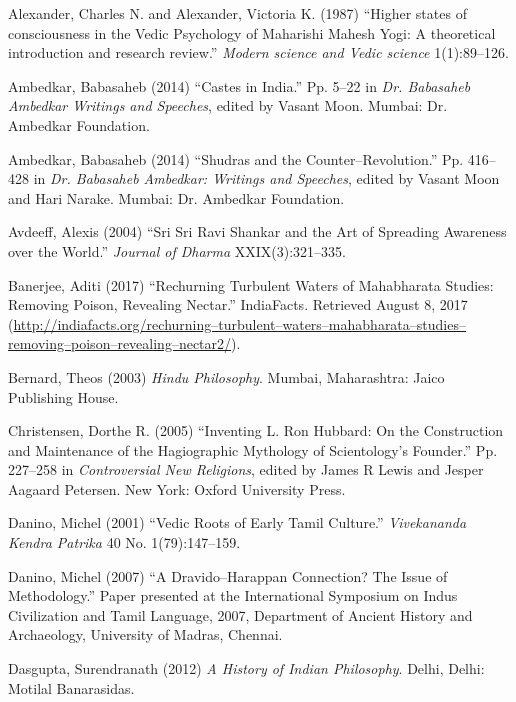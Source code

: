 \begin{thebibliography}{99}
 Alexander, Charles N. and Alexander, Victoria K. (1987) “Higher states of consciousness in the Vedic Psychology of Maharishi Mahesh Yogi: A theoretical introduction and research review.” \textit{Modern science and Vedic science} 1(1):89–126.

  Ambedkar, Babasaheb (2014) “Castes in India.” Pp. 5–22 in \textit{Dr. Babasaheb Ambedkar Writings and Speeches}, edited by Vasant Moon. Mumbai: Dr. Ambedkar Foundation.

  Ambedkar, Babasaheb (2014) “Shudras and the Counter–Revolution.” Pp. 416–428 in \textit{Dr. Babasaheb Ambedkar: Writings and Speeches}, edited by Vasant Moon and Hari Narake. Mumbai: Dr. Ambedkar Foundation.

  Avdeeff, Alexis (2004) “Sri Sri Ravi Shankar and the Art of Spreading Awareness over the World.” \textit{Journal of Dharma} XXIX(3):321–335.

  Banerjee, Aditi (2017) “Rechurning Turbulent Waters of Mahabharata Studies: Removing Poison, Revealing Nectar.” IndiaFacts. Retrieved August 8, 2017 (\url{http://indiafacts.org/rechurning–turbulent–waters–mahabharata–studies–removing–poison–revealing–nectar2/}).

  Bernard, Theos (2003) \textit{Hindu Philosophy}. Mumbai, Maharashtra: Jaico Publishing House.

  Christensen, Dorthe R. (2005) “Inventing L. Ron Hubbard: On the Construction and Maintenance of the Hagiographic Mythology of Scientology's Founder.” Pp. 227–258 in \textit{Controversial New Religions}, edited by James R Lewis and Jesper Aagaard Petersen. New York: Oxford University Press.

  Danino, Michel (2001) “Vedic Roots of Early Tamil Culture.” \textit{Vivekananda Kendra Patrika} 40 No. 1(79):147–159.

  Danino, Michel (2007) “A Dravido–Harappan Connection? The Issue of Methodology.” Paper presented at the International Symposium on Indus Civilization and Tamil Language, 2007, Department of Ancient History and Archaeology, University of Madras, Chennai.

  Dasgupta, Surendranath (2012) \textit{A History of Indian Philosophy}. Delhi, Delhi: Motilal Banarasidas.


\end{thebibliography}
